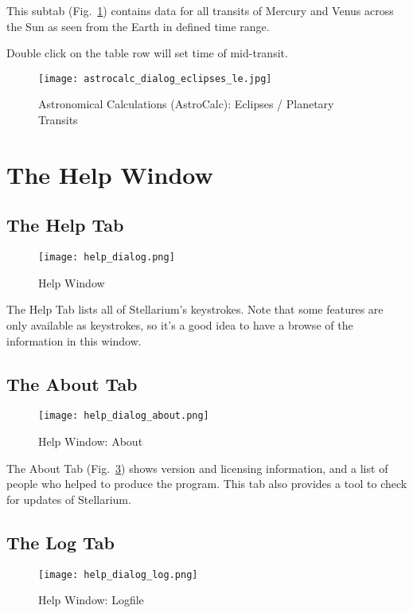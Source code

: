 This subtab (Fig.~\ref{fig:gui:AstroCalc:Eclipses:PlanetaryTransits}) contains data for all transits of Mercury and Venus across the Sun as seen from the Earth in defined time range.

Double click on the table row will set time of mid-transit.

\begin{figure}[tbp]
\centering\texttt{[image: astrocalc\_dialog\_eclipses\_le.jpg]}
\caption{Astronomical Calculations (AstroCalc): Eclipses / Planetary Transits}
\label{fig:gui:AstroCalc:Eclipses:PlanetaryTransits}
\end{figure}


\section{The Help Window}
\label{sec:gui:help}

\subsection{The Help Tab}
\label{sec:gui:help:help}
\begin{figure}[htp]
\centering\texttt{[image: help\_dialog.png]}
\caption{Help Window}
\label{fig:gui:help}
\end{figure}

\noindent The Help Tab lists all of Stellarium's keystrokes. Note that some
features are only available as keystrokes, so it's a good idea to have
a browse of the information in this window.

\subsection{The About Tab}
\label{sec:gui:help:about}
\begin{figure}[tbp]
\centering\texttt{[image: help\_dialog\_about.png]}
\caption{Help Window: About}
\label{fig:gui:help:about}
\end{figure}

The About Tab (Fig.~\ref{fig:gui:help:about}) shows version and licensing information, and a list of people who helped to produce the program.
This tab  also provides a tool to check for updates of Stellarium.

\subsection{The Log Tab}
\label{sec:gui:help:log}
\begin{figure}[tbp]
\centering\texttt{[image: help\_dialog\_log.png]}
\caption{Help Window: Logfile}
\label{fig:gui:help:log}
\end{figure}


